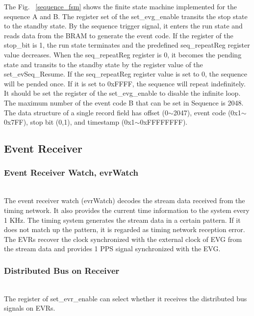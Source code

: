 \documentclass[journal,reqno]{IEEEtran}
\begin{document}
The Fig. ~\ref*{sequence_fsm} shows the finite state machine implemented for the sequence A and B. The register set of the set\_evg\_enable transits the stop state to the standby state. By the sequence trigger signal, it enters the run state and reads data from the BRAM to generate the event code. If the register of the stop\_bit is 1, the run state terminates and the predefined seq\_repeatReg register value decreases. When the seq\_repeatReg register is 0, it becomes the pending state and transits to the standby state by the register value of the set\_evSeq\_Resume. If the seq\_repeatReg register value is set to 0, the sequence will be pended once. If it is set to 0xFFFF, the sequence will repeat indefinitely. It should be set the register of the set\_evg\_enable to disable the infinite loop. The maximum number of the event code B that can be set in Sequence is 2048. The data structure of a single record field has offset (0$\sim$2047), event code (0x1$\sim$0x7FF), stop bit (0,1), and timestamp (0x1$\sim$0xFFFFFFFF).

\subsection{Event Receiver}
\subsubsection{Event Receiver Watch, evrWatch}\hspace*{\fill} \\
The event receiver watch (evrWatch) decodes the stream data received from the timing network. It also provides the current time information to the system every 1 KHz.
The timing system generates the stream data in a certain pattern. If it does not match up the pattern, it is regarded as timing network reception error. The EVRs recover the clock synchronized with the external clock of EVG from the stream data and provides 1 PPS signal synchronized with the EVG.\newline

\subsubsection{Distributed Bus on Receiver }\hspace*{\fill} \\
The register of set\_evr\_enable can select whether it receives the distributed bus signals on EVRs. \newline
\end{document}
